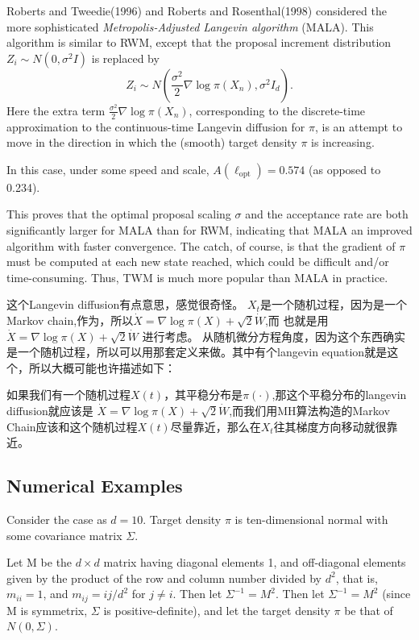 \documentclass[
]{book}
\theoremstyle{definition}
\theoremstyle{definition}
\theoremstyle{definition}
\theoremstyle{remark}
\begin{document}
Roberts and Tweedie(1996) and Roberts and Rosenthal(1998) considered the more sophisticated \emph{Metropolis-Adjusted Langevin algorithm} (MALA). This algorithm is similar to RWM, except that the proposal increment distribution \(Z_i\sim N(0,\sigma^2I)\) is replaced by
\[
Z_{i} \sim N\left(\frac{\sigma^{2}}{2} \nabla \log \pi\left(X_{n}\right), \sigma^{2} I_{d}\right).
\]
Here the extra term \(\frac{\sigma^2}{2}\nabla \log \pi (X_n)\), corresponding to the discrete-time approximation to the continuous-time Langevin diffusion for \(\pi\), is an attempt to move in the direction in which the (smooth) target density \(\pi\) is increasing.

In this case, under some speed and scale, \(A\left(\ell_{\mathrm{opt}}\right)=0.574\) (as opposed to 0.234).

This proves that the optimal proposal scaling \(\sigma\) and the acceptance rate are both significantly larger for MALA than for RWM, indicating that MALA an improved algorithm with faster convergence. The catch, of course, is that the gradient of \(\pi\) must be computed at each new state reached, which could be difficult and/or time-consuming. Thus, TWM is much more popular than MALA in practice.

这个Langevin diffusion有点意思，感觉很奇怪。
\(X_t\)是一个随机过程，因为是一个Markov chain,作为，所以\(\dot{X}=\nabla \log \pi(X)+\sqrt{2} \dot{W}\),而 也就是用\(\dot{X}=\nabla \log \pi(X)+\sqrt{2} \dot{W}\) 进行考虑。
从随机微分方程角度，因为这个东西确实是一个随机过程，所以可以用那套定义来做。其中有个langevin equation就是这个，所以大概可能也许描述如下：

如果我们有一个随机过程\(X(t)\)，其平稳分布是\(\pi(\cdot)\),那这个平稳分布的langevin diffusion就应该是 \(\dot{X}=\nabla \log \pi(X)+\sqrt{2} \dot{W}\),而我们用MH算法构造的Markov Chain应该和这个随机过程\(X(t)\)尽量靠近，那么在\(X_t\)往其梯度方向移动就很靠近。

\hypertarget{numerical-examples}{%
\subsection{Numerical Examples}\label{numerical-examples}}

Consider the case as \(d=10\). Target density \(\pi\) is ten-dimensional normal with some covariance matrix \(\Sigma\).

Let M be the \(d\times d\) matrix having diagonal elements 1, and off-diagonal elements given by the product of the row and column number divided by \(d^2\), that is, \(m_{ii}=1\), and \(m_{ij}=ij/d^2\) for \(j\neq i\). Then let \(\Sigma^{-1}=M^2\). Then let \(\Sigma^{-1}=M^{2}\) (since M is symmetrix, \(\Sigma\) is positive-definite), and let the target density \(\pi\) be that of \(N(0,\Sigma)\).
\end{document}
